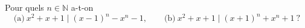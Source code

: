 Pour quels $n \in \mathbb{N}$ a-t-on
\[ \text{(a)}\ x^2 + x + 1 \mid (x - 1)^n - x^n - 1,\qquad \text{(b)}\ x^2 + x + 1 \mid (x + 1)^n + x^n + 1\ ? \]
